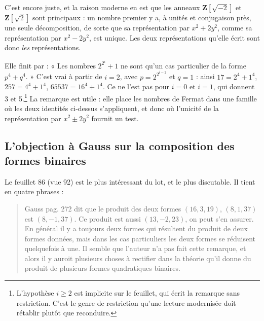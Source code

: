 \documentclass[11pt,a4paper]{article}
\begin{document}
C'est encore juste, et la raison moderne en est que les anneaux
$\mathbf{Z}[\sqrt{-2}]$ et $\mathbf{Z}[\sqrt{2}]$ sont principaux : un nombre
premier y a, à unités et conjugaison près, une seule décomposition, de sorte
que sa représentation par $x^2 + 2y^2$, comme sa représentation par
$x^2 - 2y^2$, est unique. Les deux représentations qu'elle écrit sont donc
\emph{les} représentations.

Elle finit par : « Les nombres $2^{2^i}+1$ ne sont qu'un cas particulier de la
forme $p^4+q^4$. » C'est vrai à partir de $i = 2$, avec
$p = 2^{2^{i-2}}$ et $q = 1$ : ainsi $17 = 2^4 + 1^4$,
$257 = 4^4 + 1^4$, $65537 = 16^4 + 1^4$. Ce ne l'est pas pour $i = 0$ et
$i = 1$, qui donnent 3 et 5.\footnote{L'hypothèse $i \geq 2$ est implicite sur
le feuillet, qui écrit la remarque sans restriction. C'est le genre de
restriction qu'une lecture modernisée doit rétablir plutôt que reconduire.}
La remarque est utile : elle place les nombres de Fermat dans une famille où
les deux identités ci-dessus s'appliquent, et donc où l'unicité de la
représentation par $x^2 \pm 2y^2$ fournit un test.

\subsection*{L'objection à Gauss sur la composition des formes binaires}

Le feuillet 86 (vue 92) est le plus intéressant du lot, et le plus discutable.
Il tient en quatre phrases :

\begin{quote}
Gauss pag. 272 dit que le produit des deux formes $(16, 3, 19)$, $(8, 1, 37)$
est $(8, -1, 37)$. Ce produit est aussi $(13, -2, 23)$, on peut s'en assurer.
En général il y a toujours deux formes qui résultent du produit de deux formes
données, mais dans les cas particuliers les deux formes se réduisent
quelquefois à une. Il semble que l'auteur n'a pas fait cette remarque, et alors
il y auroit plusieurs choses à rectifier dans la théorie qu'il donne du produit
de plusieurs formes quadratiques binaires.
\end{quote}
\end{document}
